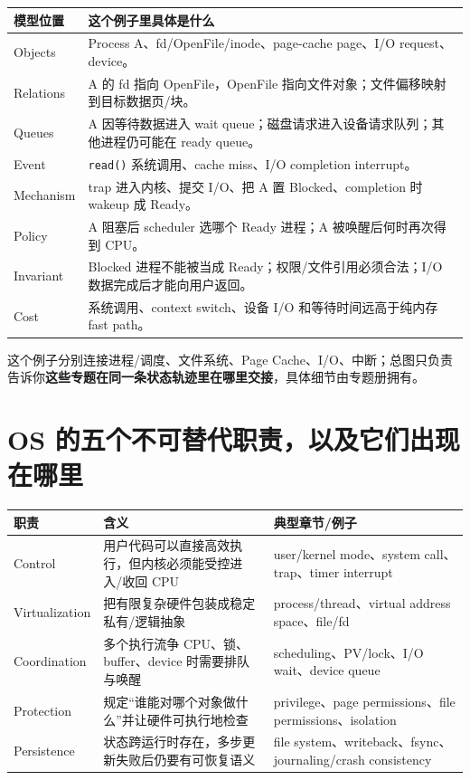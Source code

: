 \documentclass[11pt,a4paper,openany]{ctexbook}
\newcommand{\key}[1]{\textbf{\color{deep}#1}}
\begin{document}
\begin{longtable}{L{3.0cm}L{\dimexpr\linewidth-3.85cm\relax}}
\toprule
\textbf{模型位置} & \textbf{这个例子里具体是什么}\\
\midrule
Objects & Process A、fd/OpenFile/inode、page-cache page、I/O request、device。\\
Relations & A 的 fd 指向 OpenFile，OpenFile 指向文件对象；文件偏移映射到目标数据页/块。\\
Queues & A 因等待数据进入 wait queue；磁盘请求进入设备请求队列；其他进程仍可能在 ready queue。\\
Event & \texttt{read()} 系统调用、cache miss、I/O completion interrupt。\\
Mechanism & trap 进入内核、提交 I/O、把 A 置 Blocked、completion 时 wakeup 成 Ready。\\
Policy & A 阻塞后 scheduler 选哪个 Ready 进程；A 被唤醒后何时再次得到 CPU。\\
Invariant & Blocked 进程不能被当成 Ready；权限/文件引用必须合法；I/O 数据完成后才能向用户返回。\\
Cost & 系统调用、context switch、设备 I/O 和等待时间远高于纯内存 fast path。\\
\bottomrule
\end{longtable}

这个例子分别连接进程/调度、文件系统、Page Cache、I/O、中断；总图只负责告诉你\key{这些专题在同一条状态轨迹里在哪里交接}，具体细节由专题册拥有。

\section{OS 的五个不可替代职责，以及它们出现在哪里}
\begin{longtable}{L{2.8cm}L{5.0cm}L{\dimexpr\linewidth-9.07cm\relax}}
\toprule
\textbf{职责} & \textbf{含义} & \textbf{典型章节/例子}\\
\midrule
Control & 用户代码可以直接高效执行，但内核必须能受控进入/收回 CPU & user/kernel mode、system call、trap、timer interrupt \\
Virtualization & 把有限复杂硬件包装成稳定私有/逻辑抽象 & process/thread、virtual address space、file/fd \\
Coordination & 多个执行流争 CPU、锁、buffer、device 时需要排队与唤醒 & scheduling、PV/lock、I/O wait、device queue \\
Protection & 规定“谁能对哪个对象做什么”并让硬件可执行地检查 & privilege、page permissions、file permissions、isolation \\
Persistence & 状态跨运行时存在，多步更新失败后仍要有可恢复语义 & file system、writeback、fsync、journaling/crash consistency \\
\bottomrule
\end{longtable}
\end{document}
